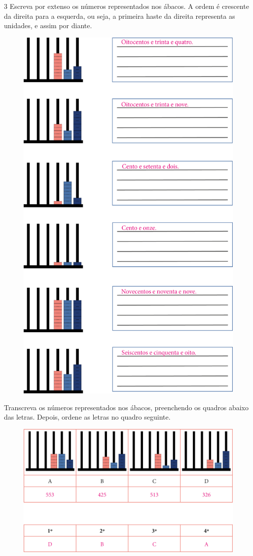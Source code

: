 \pagebreak
\num{3} Escreva por extenso os números representados nos ábacos. A ordem
é crescente da direita para a esquerda, ou seja, a primeira haste da
direita representa as unidades, e assim por diante.

\begin{figure}[htpb!]
\includegraphics[width=.7\textwidth]{./media/image5.png}
\end{figure}

\pagebreak
Transcreva os números representados nos ábacos, preenchendo os
quadros abaixo das letras. Depois, ordene as letras no quadro seguinte.

\begin{figure}[htpb!]
\includegraphics[width=\textwidth]{./media/image6.png}
\end{figure}

